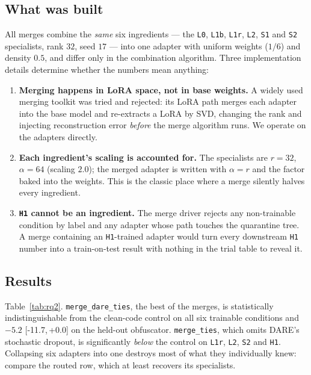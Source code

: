 \documentclass[sigconf,review,anonymous]{acmart}
\newcommand{\arm}[1]{\texttt{#1}}
\newcommand{\cond}[1]{\texttt{#1}}
\newcommand{\ci}[2]{{\small[#1,\,#2]}}
\begin{document}
\subsection{What was built}

All merges combine the \emph{same} six ingredients --- the \cond{L0}, \cond{L1b}, \cond{L1r},
\cond{L2}, \cond{S1} and \cond{S2} specialists, rank $32$, seed $17$ --- into one adapter with
uniform weights ($1/6$) and density $0.5$, and differ only in the combination algorithm.
Three implementation details determine whether the numbers mean anything:

\begin{enumerate}
\item \textbf{Merging happens in LoRA space, not in base weights.} A widely used merging toolkit
was tried and rejected: its LoRA path merges each adapter into the base model and re-extracts a
LoRA by SVD, changing the rank and injecting reconstruction error \emph{before} the merge
algorithm runs. We operate on the adapters directly.
\item \textbf{Each ingredient's scaling is accounted for.} The specialists are $r{=}32$,
$\alpha{=}64$ (scaling $2.0$); the merged adapter is written with $\alpha = r$ and the factor
baked into the weights. This is the classic place where a merge silently halves every
ingredient.
\item \textbf{\cond{H1} cannot be an ingredient.} The merge driver rejects any non-trainable
condition by label and any adapter whose path touches the quarantine tree. A merge containing an
\cond{H1}-trained adapter would turn every downstream \cond{H1} number into a train-on-test
result with nothing in the trial table to reveal it.
\end{enumerate}

\subsection{Results}

Table~\ref{tab:rq2}. \arm{merge\_dare\_ties}, the best of the merges, is statistically
indistinguishable from the clean-code control on all six trainable conditions and $-5.2$
\ci{-11.7}{+0.0} on the held-out obfuscator. \arm{merge\_ties}, which omits DARE's stochastic
dropout, is significantly \emph{below} the control on \cond{L1r}, \cond{L2}, \cond{S2} and
\cond{H1}. Collapsing six adapters into one destroys most of what they individually knew:
compare the routed row, which at least recovers its specialists.
\end{document}

